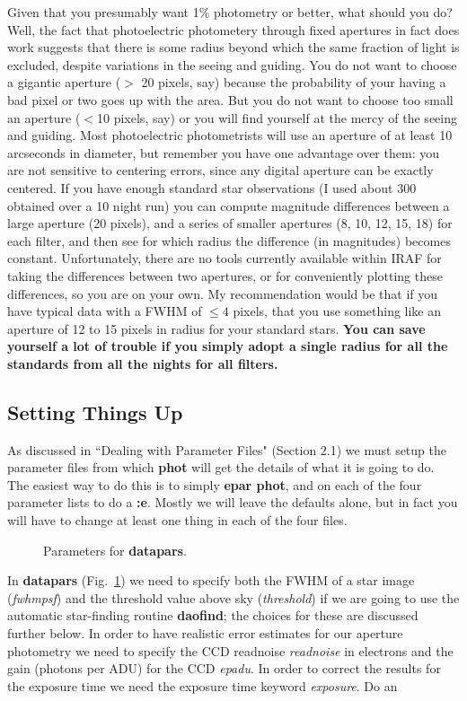 Given that you presumably want 1\% photometry or better, what should you
do?  
Well, the fact that photoelectric photometery through fixed apertures
in fact does
work suggests that there is some radius beyond which the same fraction
of
light is excluded, despite variations in the seeing and guiding.  You do
not want to choose a gigantic aperture ($>$ 20 pixels, say) because the
probability of your having a bad pixel or two goes up with the area.
But you do not want to choose too small an aperture ($<$10 pixels, say)
or you will find yourself at the mercy of the seeing and guiding.  Most
photoelectric photometrists will use an aperture of at least 10
arcseconds in diameter, but remember you have one advantage over them:
you are not sensitive to centering errors, since any digital aperture can
be exactly centered. 
If you
have enough standard star observations (I used about 300 obtained over a
10 night run) you can
compute magnitude differences between a large aperture (20 pixels),
and a series of smaller apertures (8, 10, 12, 15, 18) for each filter,
and then see for which radius the difference (in magnitudes) becomes
constant.  Unfortunately, there are no tools currently available within
IRAF for taking the differences between two apertures, or for conveniently
plotting these differences, so you are on your own.  My recommendation
would be that if you have typical data with a
FWHM of $\leq 4$ pixels, that you use something like an aperture of 12 to 15
pixels in radius for your standard stars.  {\bf You can save yourself a lot
of trouble if you simply adopt a single radius for all the standards
from all the nights for all filters.}
  
\subsection{Setting Things Up}
 
As discussed in ``Dealing with Parameter Files" (Section 2.1) we must
setup the parameter files from which {\bf phot} will get the details of
what it is going to do.  The easiest way to do this is to simply
{\bf epar phot}, and on each of the four parameter lists to do a
{\bf :e}.  Mostly we will leave the defaults alone, but in fact you will
have to change at least one thing in each of the four files.
 
\begin{figure}
\vspace{3.5in}
\caption{\label{photdatapars} Parameters for {\bf datapars}.}
\end{figure}
In {\bf datapars} (Fig.~\ref{photdatapars}) we need to specify both
the FWHM
of a star image ({\it fwhmpsf}) and the 
threshold value above sky ({\it threshold}) if we are going to use the
automatic star-finding routine {\bf daofind}; the choices for these
are discussed further below. In order to have
realistic
error estimates for our aperture photometry we need to specify 
the CCD readnoise {\it readnoise} in electrons and the
gain (photons per ADU) for the CCD {\it epadu}.  
In order to
correct the results for the exposure time we need the exposure time
keyword {\it
exposure}. Do an 
 
